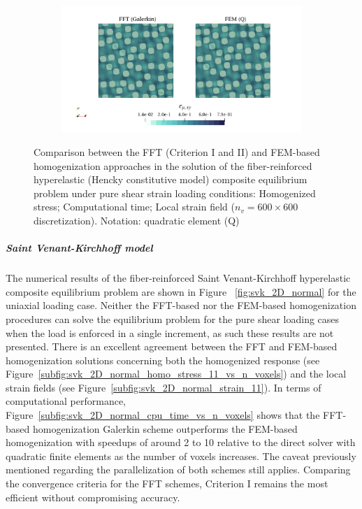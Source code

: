 \begin{figure}[hbt]
\begin{subfigure}[b]{0.49\textwidth}
    \caption{}
    \label{subfig:hencky_2D_shear_cpu_time_vs_n_voxels}
  \end{subfigure}
  \begin{subfigure}[b]{\textwidth}
    \centering
    \includegraphics[width=\textwidth]{figures/hencky_2D_shear_strain_12}
    \caption{}
    \label{subfig:hencky_2D_shear_strain_12}
  \end{subfigure}
  \caption{Comparison between the FFT (Criterion I and II) and FEM-based homogenization approaches in the
  solution of the fiber-reinforced hyperelastic (Hencky constitutive model) composite equilibrium problem under pure
  shear strain loading conditions:
   Homogenized stress;
   Computational time;
   Local strain field (\(n_v = 600 \times 600\)
  discretization). Notation: quadratic element (Q)}
\label{fig:hencky_2D_shear}
\end{figure}

\FloatBarrier

\subparagraph{Saint Venant-Kirchhoff model}

The numerical results of the fiber-reinforced Saint Venant-Kirchhoff hyperelastic composite equilibrium problem are shown in Figure
~\ref{fig:svk_2D_normal} for the uniaxial loading case.
Neither the FFT-based nor the FEM-based homogenization procedures can solve the equilibrium problem for the pure shear loading cases when the load is enforced in a single increment, as such these results are not presented.
There is an excellent agreement between the FFT and FEM-based homogenization solutions concerning both the homogenized response (see Figure~\ref{subfig:svk_2D_normal_homo_stress_11_vs_n_voxels}) and the local strain fields (see Figure~\ref{subfig:svk_2D_normal_strain_11}).
In terms of computational performance, Figure~\ref{subfig:svk_2D_normal_cpu_time_vs_n_voxels} shows that the FFT-based homogenization Galerkin scheme outperforms the FEM-based homogenization with speedups of around 2 to 10 relative to the direct solver with quadratic finite elements as the number of voxels increases.
The caveat previously mentioned regarding the parallelization of both schemes still applies.
Comparing the convergence criteria for the FFT schemes, Criterion I remains the most efficient without compromising accuracy.

